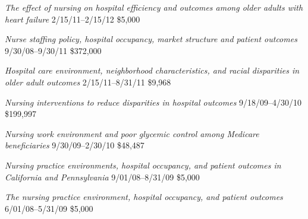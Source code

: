 \documentclass[10pt,]{article}
\begin{document}
{{{{{{{{{{{{{\textit {The effect of nursing on hospital efficiency and outcomes among older adults with heart failure} \hfill 2/15/11--2/15/12 \newline
{}	\hfill \$5,000

\textit {Nurse staffing policy, hospital occupancy, market structure and patient outcomes} \hfill 9/30/08--9/30/11 \newline
{}	\hfill \$372,000

\textit {Hospital care environment, neighborhood characteristics, and racial disparities in older adult outcomes} \hfill 2/15/11--8/31/11 \newline
{}	\hfill \$9,968

\textit {Nursing interventions to reduce disparities in hospital outcomes} \hfill 9/18/09--4/30/10 \newline
{}	\hfill \$199,997

\textit {Nursing work environment and poor glycemic control among Medicare beneficiaries} \hfill 9/30/09--2/30/10 \newline
{}	\hfill \$48,487

\textit {Nursing practice environments, hospital occupancy, and patient outcomes in California and Pennsylvania} \hfill 9/01/08--8/31/09 \newline
{} \hfill \$5,000

\textit {The nursing practice environment, hospital occupancy, and patient outcomes} \hfill 6/01/08--5/31/09 \newline
{}	\hfill \$5,000

}}}}}}}}}}}}}
\end{document}
